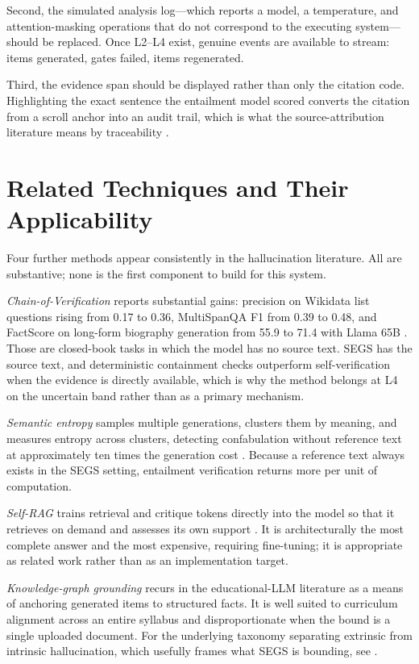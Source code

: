 \documentclass[stu,11pt,floatsintext]{apa7}
\begin{document}
Second, the simulated analysis log---which reports a model, a temperature, and
attention-masking operations that do not correspond to the executing
system---should be replaced. Once L2--L4 exist, genuine events are available to
stream: items generated, gates failed, items regenerated.

Third, the evidence span should be displayed rather than only the citation code.
Highlighting the exact sentence the entailment model scored converts the
citation from a scroll anchor into an audit trail, which is what the
source-attribution literature means by traceability \parencite{gao2023enabling}.

\section{Related Techniques and Their Applicability}

Four further methods appear consistently in the hallucination literature. All
are substantive; none is the first component to build for this system.

\emph{Chain-of-Verification} reports substantial gains: precision on Wikidata
list questions rising from 0.17 to 0.36, MultiSpanQA F1 from 0.39 to 0.48, and
FactScore on long-form biography generation from 55.9 to 71.4 with Llama 65B
\parencite{dhuliawala2024chain}. Those are closed-book tasks in which the model
has no source text. SEGS has the source text, and deterministic containment
checks outperform self-verification when the evidence is directly available,
which is why the method belongs at L4 on the uncertain band rather than as a
primary mechanism.

\emph{Semantic entropy} samples multiple generations, clusters them by meaning,
and measures entropy across clusters, detecting confabulation without reference
text at approximately ten times the generation cost
\parencite{farquhar2024semantic}. Because a reference text always exists in the
SEGS setting, entailment verification returns more per unit of computation.

\emph{Self-RAG} trains retrieval and critique tokens directly into the model so
that it retrieves on demand and assesses its own support
\parencite{asai2024selfrag}. It is architecturally the most complete answer and
the most expensive, requiring fine-tuning; it is appropriate as related work
rather than as an implementation target.

\emph{Knowledge-graph grounding} recurs in the educational-LLM literature as a
means of anchoring generated items to structured facts. It is well suited to
curriculum alignment across an entire syllabus and disproportionate when the
bound is a single uploaded document. For the underlying taxonomy separating
extrinsic from intrinsic hallucination, which usefully frames what SEGS is
bounding, see \textcite{bang2025hallulens}.
\end{document}
